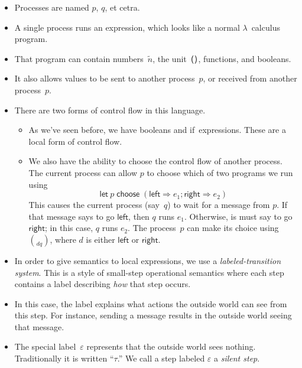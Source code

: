 \documentclass{lecturenotes}
\newcommand{\abs}[2]{\ensuremath{\lambda #1.\,#2}}
\newcommand{\app}[2]{\ensuremath{#1\;#2}}
\newcommand{\unit}{\ensuremath{\textsf{(}\mkern0.5mu\textsf{)}}}
\renewcommand{\tt}{\textsf{true}\xspace}
\newcommand{\ff}{\textsf{false}\xspace}
\newcommand{\ite}[3]{\ensuremath{\textsf{if}~#1 \mathrel{\textsf{then}} #2 \mathrel{\textsf{else}} #3}}
\newcommand{\send}[2]{\ensuremath{\textsf{send}~#1 \mathrel{\textsf{to}} #2}}
\newcommand{\recv}[3]{\ensuremath{\textsf{receive}~#1 \mathrel{\textsf{from}} #2 \mathrel{\textsf{in}} #3}}
\newcommand{\Left}{\textsf{left}\xspace}
\newcommand{\Right}{\textsf{right}\xspace}
\newcommand{\choosefor}[2]{\ensuremath{\textsf{choose}~#1 \mathrel{\textsf{for}} #2}}
\newcommand{\letchoose}[3]{\ensuremath{\textsf{let}~#1 \mathrel{\textsf{choose}} (\Left \Rightarrow #2; \Right \Rightarrow #3)}}
\newcommand{\senda}[2]{#1 \rightsquigarrow #2}
\newcommand{\recva}[2]{#1 \leftsquigarrow #2}
\newcommand{\choosea}[2]{[#1] \rightsquigarrow #2}
\newcommand{\letchoosea}[2]{[#1] \leftsquigarrow #2}
\begin{document}
\begin{itemize}
\item Processes are named $p$, $q$, et cetra.
\item A single process runs an expression, which looks like a normal $\lambda$~calculus program.
\item That program can contain numbers~$\tilde{n}$, the unit~$\unit$, functions, and booleans.
\item It also allows values to be sent to another process~$p$, or received from another process~$p$.
\item There are two forms of control flow in this language.
  \begin{itemize}
  \item As we've seen before, we have booleans and \textsf{if}~expressions.
    These are a local form of control flow.
  \item We also have the ability to choose the control flow of another process.
    The current process can allow $p$ to choose which of two programs we run using $$\letchoose{p}{e_1}{e_2}$$
    This causes the current process (say~$q$) to wait for a message from $p$.
    If that message says to go $\Left$, then $q$ runs $e_1$.
    Otherwise, is must say to go $\Right$; in this case, $q$ runs $e_2$.
    The process~$p$ can make its choice using $\choose{d}{q}$, where $d$ is either $\Left$ or $\Right$.
  \end{itemize}
\item In order to give semantics to local expressions, we use a \emph{labeled-transition system}.
  This is a style of small-step operational semantics where each step contains a label describing \emph{how} that step occurs.
\item In this case, the label explains what actions the outside world can see from this step.
  For instance, sending a message results in the outside world seeing that message.
\item The special label~$\varepsilon$ represents that the outside world sees nothing.
  Traditionally it is written ``$\tau$.''
  We call a step labeled $\varepsilon$ a \emph{silent step}.
\end{itemize}

\end{document}
